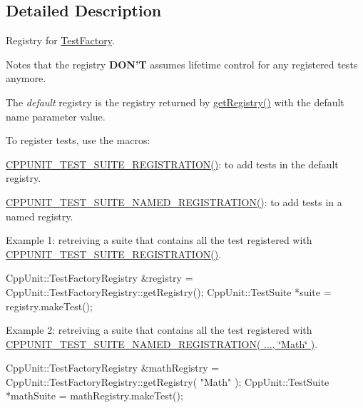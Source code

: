 \subsection{Detailed Description}
Registry for \hyperlink{class_test_factory}{Test\-Factory}.

Notes that the registry {\bfseries D\-O\-N'T} assumes lifetime control for any registered tests anymore. 

The {\itshape default} registry is the registry returned by \hyperlink{class_test_factory_registry_a1331b28bb1a8bc3db6b8e5ec994ef4ab}{get\-Registry()} with the default name parameter value.

To register tests, use the macros\-:
\begin{DoxyItemize}
\item \hyperlink{_helper_macros_8h_a2f4071eec88d1e306665ada0f2dd80e4}{C\-P\-P\-U\-N\-I\-T\-\_\-\-T\-E\-S\-T\-\_\-\-S\-U\-I\-T\-E\-\_\-\-R\-E\-G\-I\-S\-T\-R\-A\-T\-I\-O\-N()}\-: to add tests in the default registry.
\item \hyperlink{_helper_macros_8h_a028a5855a40ad3836e2a26aa48cd4c91}{C\-P\-P\-U\-N\-I\-T\-\_\-\-T\-E\-S\-T\-\_\-\-S\-U\-I\-T\-E\-\_\-\-N\-A\-M\-E\-D\-\_\-\-R\-E\-G\-I\-S\-T\-R\-A\-T\-I\-O\-N()}\-: to add tests in a named registry.
\end{DoxyItemize}

Example 1\-: retreiving a suite that contains all the test registered with \hyperlink{_helper_macros_8h_a2f4071eec88d1e306665ada0f2dd80e4}{C\-P\-P\-U\-N\-I\-T\-\_\-\-T\-E\-S\-T\-\_\-\-S\-U\-I\-T\-E\-\_\-\-R\-E\-G\-I\-S\-T\-R\-A\-T\-I\-O\-N()}. 
\begin{DoxyCode}
CppUnit::TestFactoryRegistry &registry = CppUnit::TestFactoryRegistry::getRegistry();
CppUnit::TestSuite *suite = registry.makeTest();
\end{DoxyCode}


Example 2\-: retreiving a suite that contains all the test registered with \hyperlink{_helper_macros_8h_a028a5855a40ad3836e2a26aa48cd4c91}{C\-P\-P\-U\-N\-I\-T\-\_\-\-T\-E\-S\-T\-\_\-\-S\-U\-I\-T\-E\-\_\-\-N\-A\-M\-E\-D\-\_\-\-R\-E\-G\-I\-S\-T\-R\-A\-T\-I\-O\-N( ..., \char`\"{}\-Math\char`\"{} )}. 
\begin{DoxyCode}
CppUnit::TestFactoryRegistry &mathRegistry = CppUnit::TestFactoryRegistry::getRegistry( \textcolor{stringliteral}{"Math"} );
CppUnit::TestSuite *mathSuite = mathRegistry.makeTest();
\end{DoxyCode}


